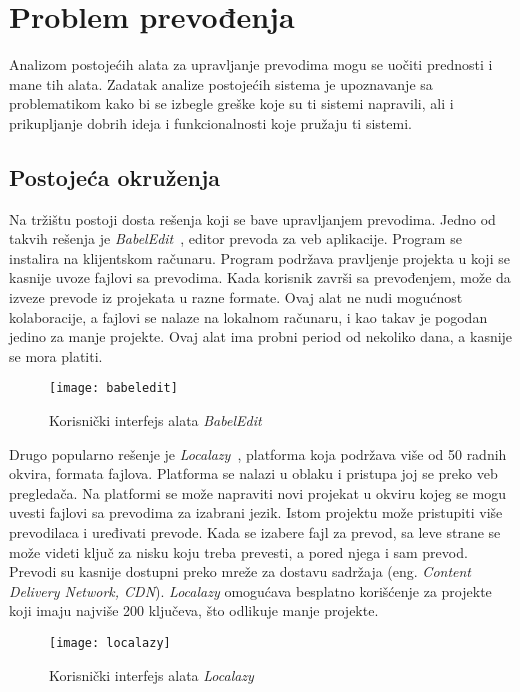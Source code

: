 \section{Problem prevođenja}\label{ch:analiza}

Analizom postojećih alata za upravljanje prevodima mogu se uočiti prednosti i mane tih alata. 
Zadatak analize postojećih sistema je upoznavanje sa problematikom kako bi se izbegle greške
koje su ti sistemi napravili, ali i prikupljanje dobrih ideja i funkcionalnosti koje pružaju ti sistemi.


\subsection{Postojeća okruženja}\label{sec:analiza-postojeca_okruzenja}

Na tržištu postoji dosta rešenja koji se bave upravljanjem prevodima. Jedno od takvih rešenja je 
\textit{BabelEdit}~\cite{BabelEdit}, editor prevoda za veb aplikacije. Program se instalira na klijentskom računaru.
Program podržava pravljenje projekta u koji se kasnije uvoze fajlovi sa prevodima. Kada korisnik završi 
sa prevođenjem, može da izveze prevode iz projekata u razne formate. Ovaj alat ne nudi mogućnost kolaboracije,
a fajlovi se nalaze na lokalnom računaru, i kao takav je pogodan jedino za manje projekte. Ovaj alat ima 
probni period od nekoliko dana, a kasnije se mora platiti.

\begin{figure}[h]
    \centering
    \texttt{[image: babeledit]}
    \caption{Korisnički interfejs alata \textit{BabelEdit}}
\end{figure}

Drugo popularno rešenje je \textit{Localazy}~\cite{Localazy}, platforma koja podržava više od 50 radnih okvira, 
formata fajlova. Platforma se nalazi u oblaku i pristupa joj se preko veb pregledača. Na platformi se može 
napraviti novi projekat u okviru kojeg se mogu uvesti fajlovi sa prevodima za izabrani jezik. Istom projektu 
može pristupiti više prevodilaca i uređivati prevode. Kada se izabere fajl za prevod, sa leve strane se može 
videti ključ za nisku koju treba prevesti, a pored njega i sam prevod. Prevodi su kasnije dostupni preko 
mreže za dostavu sadržaja (eng. \textit{Content Delivery Network, CDN}). \textit{Localazy} omogućava besplatno korišćenje za 
projekte koji imaju najviše 200 ključeva, što odlikuje manje projekte.

\begin{figure}[h]
    \centering
    \texttt{[image: localazy]}
    \caption{Korisnički interfejs alata \textit{Localazy}}
\end{figure}

